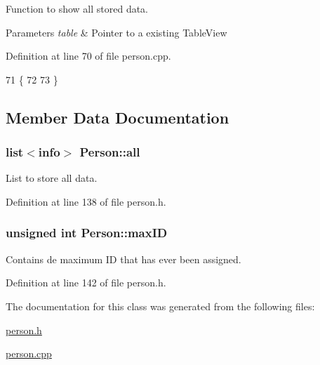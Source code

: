 Function to show all stored data. 


\begin{DoxyParams}{Parameters}
{\em table} & Pointer to a existing Table\+View \\
\hline
\end{DoxyParams}


Definition at line 70 of file person.\+cpp.


\begin{DoxyCode}
71 \{
72 
73 \}
\end{DoxyCode}


\subsection{Member Data Documentation}
\hypertarget{class_person_a23d6ff8cb8e45c9e3502baffa6a0468a}{
\subsubsection[{all}]{\setlength{\rightskip}{0pt plus 5cm}list$<${\bf info}$>$ Person\+::all\hspace{0.3cm}{\ttfamily [private]}}}\label{class_person_a23d6ff8cb8e45c9e3502baffa6a0468a}


List to store all data. 



Definition at line 138 of file person.\+h.

\hypertarget{class_person_a816ee6194426eb703b61ae267e8e8ee6}{
\subsubsection[{max\+I\+D}]{\setlength{\rightskip}{0pt plus 5cm}unsigned int Person\+::max\+I\+D\hspace{0.3cm}{\ttfamily [private]}}}\label{class_person_a816ee6194426eb703b61ae267e8e8ee6}


Contains de maximum I\+D that has ever been assigned. 



Definition at line 142 of file person.\+h.



The documentation for this class was generated from the following files\+:\begin{DoxyCompactItemize}
\item 
\hyperlink{person_8h}{person.\+h}\item 
\hyperlink{person_8cpp}{person.\+cpp}\end{DoxyCompactItemize}
